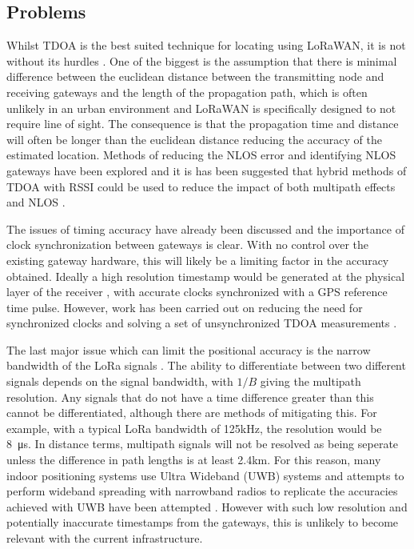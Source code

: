 \documentclass[a4paper]{report}
\begin{document}
    \subsection{Problems}
      Whilst TDOA is the best suited technique for locating using LoRaWAN, it is not without its hurdles \cite{LinkLabs}. One of the biggest is the assumption that there is minimal difference between the euclidean distance between the transmitting node and receiving gateways and the length of the propagation path, which is often unlikely in an urban environment and LoRaWAN is specifically designed to not require line of sight. The consequence is that the propagation time and distance will often be longer than the euclidean distance reducing the accuracy of the estimated location. Methods of reducing the NLOS error and identifying NLOS gateways have been explored \cite{Cong2001} and it is has been suggested that hybrid methods of TDOA with RSSI could be used to reduce the impact of both multipath effects and NLOS \cite{Lategahn2013}\cite{ElGemayel2013a}.

      The issues of timing accuracy have already been discussed and the importance of clock synchronization between gateways is clear. With no control over the existing gateway hardware, this will likely be a limiting factor in the accuracy obtained. Ideally a high resolution timestamp would be generated at the physical layer of the receiver \cite{Li2011}, with accurate clocks synchronized with a GPS reference time pulse. However, work has been carried out on reducing the need for synchronized clocks \cite{Li2014} and solving a set of unsynchronized TDOA measurements \cite{Burgess2014}.

      The last major issue which can limit the positional accuracy is the narrow bandwidth of the LoRa signals \cite{LinkLabs}. The ability to differentiate between two different signals depends on the signal bandwidth, with \(1/B\) giving the multipath resolution. Any signals that do not have a time difference greater than this cannot be differentiated, although there are methods of mitigating this. For example, with a typical LoRa bandwidth of 125kHz, the resolution would be \SI{8}{\micro\second}. In distance terms, multipath signals will not be resolved as being seperate unless the difference in path lengths is at least 2.4km. For this reason, many indoor positioning systems use Ultra Wideband (UWB) systems and attempts to perform wideband spreading with narrowband radios to replicate the accuracies achieved with UWB have been attempted \cite{Kempke2014}. However with such low resolution and potentially inaccurate timestamps from the gateways, this is unlikely to become relevant with the current infrastructure.
\end{document}
